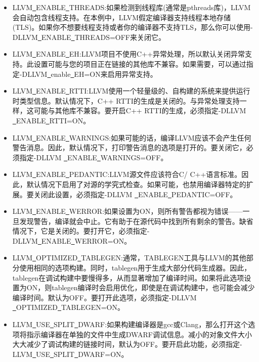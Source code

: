 \begin{itemize}
	\item LLVM\underline{~}ENABLE\underline{~}THREADS:如果检测到线程库(通常是pthreads库)，LLVM会自动包含线程支持。在本例中，LLVM假定编译器支持线程本地存储(TLS)。如果你不想要线程支持或者你的编译器不支持TLS，那么你可以使用-DLLVM\underline{~}ENABLE\underline{~}THREADS=OFF来关闭它。
	
	\item LLVM\underline{~}ENABLE\underline{~}EH:LLVM项目不使用C++异常处理，所以默认关闭异常支持。此设置可能与您的项目正在链接的其他库不兼容。如果需要，可以通过指定-DLLVM\underline{~}enable\underline{~}EH=ON来启用异常支持。
	
	\item LLVM\underline{~}ENABLE\underline{~}RTTI:LLVM使用一个轻量级的、自构建的系统来提供运行时类型信息。默认情况下，C++ RTTI的生成是关闭的。与异常处理支持一样，这可能与其他库不兼容。要开启C++ RTTI的生成，必须指定-DLLVM \underline{~}ENABLE\underline{~}RTTI=ON。
	
	\item LLVM\underline{~}ENABLE\underline{~}WARNINGS:如果可能的话，编译LLVM应该不会产生任何警告消息。因此，默认情况下，打印警告消息的选项是打开的。要关闭它，必须指定-DLLVM \underline{~}ENABLE\underline{~}WARNI\allowbreak NGS=OFF。
	
	\item LLVM\underline{~}ENABLE\underline{~}PEDANTIC:LLVM源文件应该符合C/ C++语言标准。因此，默认情况下启用了对源的学究式检查。如果可能，也禁用编译器特定的扩展。要关闭此设置，必须指定-DLLVM \underline{~}ENABLE\underline{~}PEDANTIC=OFF。
	
	\item LLVM\underline{~}ENABLE\underline{~}WERROR:如果设置为ON，则所有警告都视为错误——一旦发现警告，编译就会中止。它有助于在源代码中找到所有剩余的警告。缺省情况下，它是关闭的。要打开它，必须指定-DLLVM\underline{~}ENABLE\underline{~}WERROR=ON。
	
	\item LLVM\underline{~}OPTIMIZED\underline{~}TABLEGEN:通常，TABLEGEN工具与LLVM的其他部分使用相同的选项构建。同时，tablegen用于生成大部分代码生成器。因此，tablegen在调试构建中要慢得多，从而显著增加了编译时间。如果将此选项设置为ON，则tablegen编译时会启用优化，即使是在调试构建中，也可能会减少编译时间。默认为OFF。要打开此选项，必须指定-DLLVM \underline{~}OPTIMIZED\underline{~}TABLEGEN=ON。
	
	\item LLVM\underline{~}USE\underline{~}SPLIT\underline{~}DWARF:如果构建编译器是gcc或Clang，那么打开这个选项将指示编译器在单独的文件中生成DWARF调试信息。减小的对象文件大小大大减少了调试构建的链接时间，默认为OFF。要开启此功能，必须指定-LLVM\underline{~}USE\underline{~}SPLIT\underline{~}DWARF=ON。

\end{itemize}

